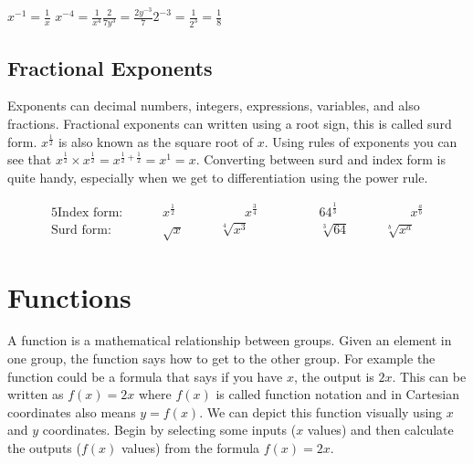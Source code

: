 \begin{tcolorbox}
	\hspace{1cm}$x^{-1}=\frac{1}{x}$ \hspace{2cm}$x^{-4}=\frac{1}{x^4}$\hspace{2cm}$\frac{2}{7y^3}=\frac{2y^{-3}}{7} $\hspace{2cm}$2^{-3}=\frac{1}{2^3}=\frac{1}{8} $
\end{tcolorbox}	

\subsection*{Fractional Exponents}
Exponents can decimal numbers, integers, expressions, variables, and also fractions. Fractional exponents can written using a root sign, this is called surd form. $x^{\frac{1}{2}}$ is also known as the square root of $x$. Using rules of exponents you can see that $x^{\frac{1}{2}}\times x^{\frac{1}{2}}=x^{\frac{1}{2}+\frac{1}{2}}=x^1=x$. Converting between surd and index form is quite handy, especially when we get to differentiation using the power rule.
\begin{tcolorbox}\begin{alignat*}{5}
\textrm{Index form: }\qquad&x^{\frac{1}{2}}&\qquad\qquad x^{\frac{3}{4}} &\qquad\qquad 64^{\frac{1}{3}}&\qquad\qquad x^\frac{a}{b}\\
\textrm{Surd form: }\qquad&\sqrt{x}&\qquad \sqrt[4]{x^3}&\qquad\qquad\sqrt[3]{64}&\qquad \sqrt[b]{x^a}
\end{alignat*}\end{tcolorbox}
	
\section{Functions}	
A function is a mathematical relationship between groups. Given an element in one group, the function says how to get to the other group. For example the function could be a formula that says if you have $x$, the output is $2x$. This can be written as $f(x)=2x$ where $f(x)$ is called function notation and in Cartesian coordinates also means $y=f(x)$. We can depict this function visually using $x$ and $y$ coordinates. Begin by selecting some inputs ($x$ values) and then calculate the outputs ($f(x)$ values) from the formula $f(x)=2x$.

